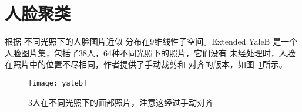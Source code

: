 \documentclass[main.tex]{subfiles}
\begin{document}
\section{人脸聚类}

根据 \cite{basri2003lambertianface} 不同光照下的人脸图片近似
分布在9维线性子空间。Extended YaleB \cite{lee2005extendedyalb}
是一个人脸图片集，包括了38人，64种不同光照下的照片，它们没有
未经处理时，人脸在照片中的位置不尽相同，作者提供了手动裁剪和
对齐的版本，如图~\ref{fig:yaleb}所示。
\begin{figure}[h]
  \centering
  \texttt{[image: yaleb]}
  \caption{3人在不同光照下的面部照片，注意这经过手动对齐}
  \label{fig:yaleb}
\end{figure}
\end{document}
